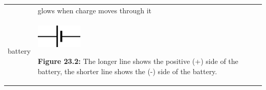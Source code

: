 \begin{center}
\begin{xtabular*}{\mytablewidth}[t]{|p{10\mystarwidth}|p{10\mystarwidth}|p{10\mystarwidth}|}
\begin{center}
      \vspace{2pt}
    \vspace{.1in}
    
    \end{center}



    \addtocounter{footnote}{-0}
    
                   &
    
    
        glows when charge moves through it%
     \tabularnewline{}
    
    
        battery &
    
    
        
                    
    \setcounter{subfigure}{0}

\label{m38516*id62930}
    \begin{center}
    \label{m38516*id62930!!!underscore!!!media}\label{m38516*id62930!!!underscore!!!printimage}\includegraphics[width=0.2\textwidth]{col11305.imgs/m38516_PG10C9_002.png} %
        
      \vspace{2pt}
    \vspace{\rubberspace}\par \begin{cnxcaption}
	  \small \textbf{Figure 23.2: }The longer line shows the positive (+) side of the battery, the shorter line shows the (-) side of the battery.
	\end{cnxcaption}
      
    \vspace{.1in}
    

\end{center}
\end{xtabular*}
\end{center}
